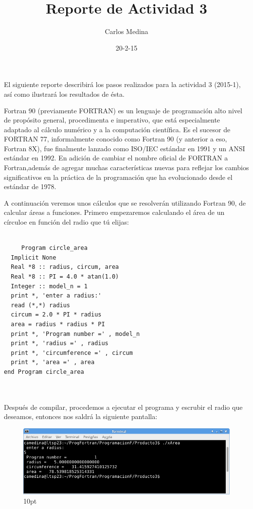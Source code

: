\documentclass[12pt]{article}
\title{Reporte de Actividad 3}
\author{Carlos Medina}
\date{20-2-15}
\begin{document}
\maketitle


El siguiente reporte describirá los pasos realizados para la actividad 3 (2015-1), así como ilustrará los resultados de ésta.




\hspace {0.5cm} Fortran 90 (previamente FORTRAN) es un lenguaje de programación alto nivel de propósito general, procedimenta e imperativo, que está especialmente adaptado al cálculo numérico y a la computación científica. Es el sucesor de FORTRAN 77, informalmente conocido como Fortran 90 (y anterior a eso, Fortran 8X), fue finalmente lanzado como ISO/IEC estándar en 1991 y un ANSI estándar en 1992. En adición de cambiar el nombre oficial de FORTRAN a Fortran,además de agregar muchas características nuevas para reflejar los cambios significativos en la práctica de la programación que ha evolucionado desde el estándar de 1978.




\hspace {0.5cm} A continuación veremos unos cálculos que se resolverán utilizando Fortran 90, de calcular áreas a funciones.
\vspace {0.5cm}
     Primero empezaremos calculando el área de un círculoe en función del radio que tú elijas:
     
     \begin{verbatim}
     
     Program circle_area
  Implicit None
  Real *8 :: radius, circum, area
  Real *8 :: PI = 4.0 * atan(1.0)
  Integer :: model_n = 1
  print *, 'enter a radius:'
  read (*,*) radius
  circum = 2.0 * PI * radius
  area = radius * radius * PI 
  print *, 'Program number =' , model_n
  print *, 'radius =' , radius
  print *, 'circumference =' , circum
  print *, 'area =' , area
end Program circle_area 
 
    
     \end{verbatim}
     
Después de compilar, procedemos a ejecutar el programa y escrubir el radio que deseamos, entonces nos saldrá la siguiente pantalla:
     
     

\begin{figure}[h]
\hspace{-3.7cm}
\includegraphics{1.png}{10pt}

\end{figure}

 
 
\end{document}

